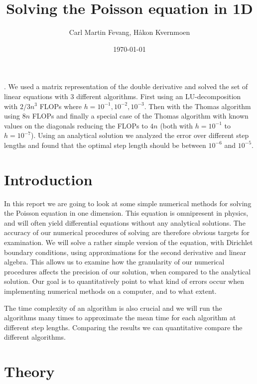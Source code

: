 \documentclass[english]{article}
\begin{document}
\title{Solving the Poisson equation in 1D} 
\author{Carl Martin Fevang, Håkon Kvernmoen}   
\date{\today}    

\maketitle
{}. We used a matrix representation of the double derivative and solved the set of linear equations with 3 different algorithms. First using an LU-decomposition with $2/3 n^3$ FLOPs where $h=10^{-1}, 10^{-2}, 10^{-3}$. Then with the Thomas algorithm using $8n$ FLOPs and finally a special case of the Thomas algorithm with known values on the diagonals reducing the FLOPs to $4n$ (both with $h=10
^{-1}$ to $h = 10^{-7}$). Using an analytical solution we analyzed the error over different step lengths and found that the optimal step length should be between $10^{-6}$ and $10^{-5}$.

\section{Introduction}
 In this report we are going to look at some simple numerical methods for solving the Poisson equation in one dimension. This equation is omnipresent in physics, and will often yield differential equations without any analytical solutions. The accuracy of our numerical procedures of solving are therefore obvious targets for examination. We will solve a rather simple version of the equation, with Dirichlet boundary conditions, using approximations for the second derivative and linear algebra. This allows us to examine how the granularity of our numerical procedures affects the precision of our solution, when compared to the analytical solution. Our goal is to quantitatively point to what kind of errors occur when implementing numerical methods on a computer, and to what extent.

The time complexity of an algorithm is also crucial and we will run the algorithms many times to approximate the mean time for each algorithm at different step lengths. Comparing the results we can quantitative compare the different algorithms.
\section{Theory}
\end{document}
